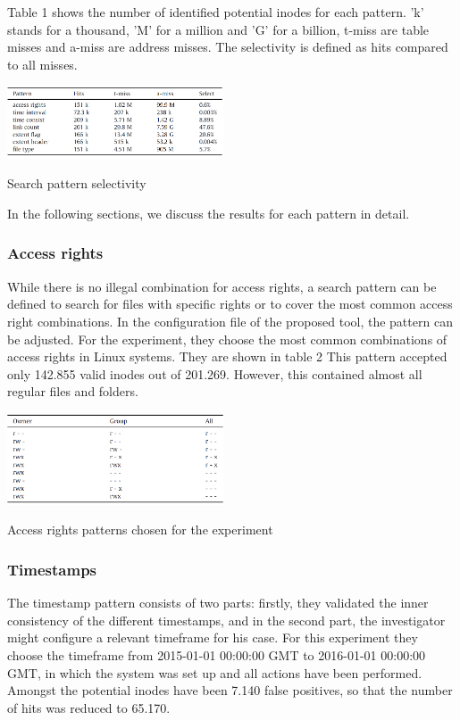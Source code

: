 \documentclass{acm_proc_article-sp}
\begin{document}
Table 1 shows the number of identified potential inodes for each pattern. 'k' stands for a thousand, 'M' for a million and 'G' for a billion, t-miss are table misses and a-miss are address misses. The selectivity is defined as hits compared to all misses.

\begin{table}
\centering
\includegraphics[width=0.48\textwidth]{images/selectivity.png}
	\caption{Search pattern selectivity}
\end{table}


In the following sections, we discuss the results for each pattern in detail.

\subsubsection{Access rights}

While there is no illegal combination for access rights, a search pattern can be defined to search for files with specific rights or to cover the most common access right combinations. In the configuration file of the proposed tool, the pattern can be adjusted. For the experiment, they choose the most common combinations of access rights in Linux systems. They are shown in table 2
This pattern accepted only 142.855 valid inodes out of 201.269.  However, this contained almost all regular files and folders.

\begin{table}
\centering
\includegraphics[width=0.48\textwidth]{images/rights.png}
	\caption{Access rights patterns chosen for the experiment}
\end{table}

\subsubsection{Timestamps}

The timestamp pattern consists of two parts: firstly, they validated the inner consistency of the different timestamps, and in the second part, the investigator might configure a relevant timeframe for his case. For this experiment they choose the timeframe from 2015-01-01 00:00:00 GMT to 2016-01-01 00:00:00 GMT, in which the system was set up and all actions have been performed. Amongst the potential inodes have been 7.140 false positives, so that the number of hits was reduced to 65.170.
\end{document}
